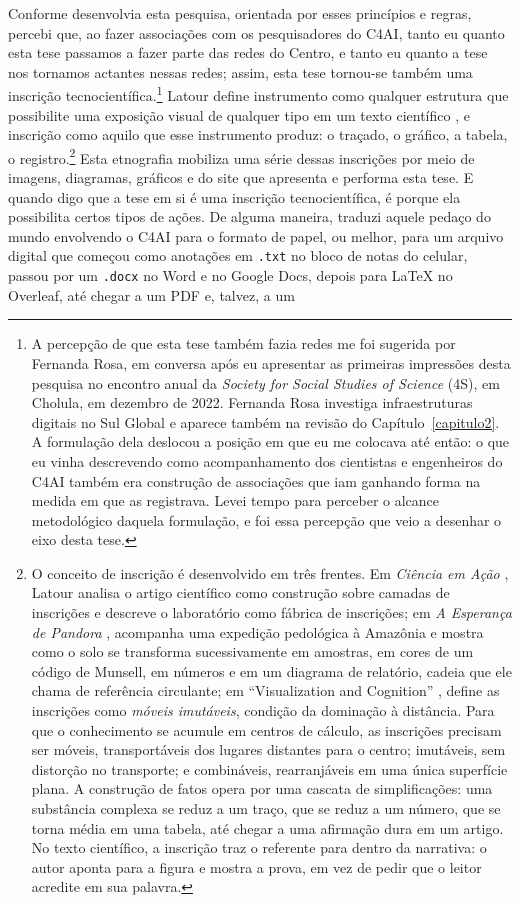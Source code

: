Conforme desenvolvia esta pesquisa, orientada por esses princípios e regras, percebi que, ao fazer associações com os pesquisadores do C4AI, tanto eu quanto esta tese passamos a fazer parte das redes do Centro, e tanto eu quanto a tese nos tornamos actantes nessas redes; assim, esta tese tornou-se também uma inscrição tecnocientífica.\footnote{A percepção de que esta tese também fazia redes me foi sugerida por Fernanda Rosa, em conversa após eu apresentar as primeiras impressões desta pesquisa no encontro anual da \textit{Society for Social Studies of Science} (4S), em Cholula, em dezembro de 2022. Fernanda Rosa investiga infraestruturas digitais no Sul Global e aparece também na revisão do Capítulo~\ref{capitulo2}. A formulação dela deslocou a posição em que eu me colocava até então: o que eu vinha descrevendo como acompanhamento dos cientistas e engenheiros do C4AI também era construção de associações que iam ganhando forma na medida em que as registrava. Levei tempo para perceber o alcance metodológico daquela formulação, e foi essa percepção que veio a desenhar o eixo desta tese.} Latour define instrumento como qualquer estrutura que possibilite uma exposição visual de qualquer tipo em um texto científico \parencite[p.~102]{Latour2011CienciaEmAcao}, e inscrição como aquilo que esse instrumento produz: o traçado, o gráfico, a tabela, o registro.\footnote{O conceito de inscrição é desenvolvido em três frentes. Em \textit{Ciência em Ação} \parencite[caps.~1--2]{Latour2011CienciaEmAcao}, Latour analisa o artigo científico como construção sobre camadas de inscrições e descreve o laboratório como fábrica de inscrições; em \textit{A Esperança de Pandora} \parencite[cap.~2]{Latour2017Esperanca}, acompanha uma expedição pedológica à Amazônia e mostra como o solo se transforma sucessivamente em amostras, em cores de um código de Munsell, em números e em um diagrama de relatório, cadeia que ele chama de referência circulante; em \enquote{Visualization and Cognition} \parencite{Latour1986Visualization}, define as inscrições como \textit{móveis imutáveis}, condição da dominação à distância. Para que o conhecimento se acumule em centros de cálculo, as inscrições precisam ser móveis, transportáveis dos lugares distantes para o centro; imutáveis, sem distorção no transporte; e combináveis, rearranjáveis em uma única superfície plana. A construção de fatos opera por uma cascata de simplificações: uma substância complexa se reduz a um traço, que se reduz a um número, que se torna média em uma tabela, até chegar a uma afirmação dura em um artigo. No texto científico, a inscrição traz o referente para dentro da narrativa: o autor aponta para a figura e mostra a prova, em vez de pedir que o leitor acredite em sua palavra.} Esta etnografia mobiliza uma série dessas inscrições por meio de imagens, diagramas, gráficos e do site que apresenta e performa esta tese. E quando digo que a tese em si é uma inscrição tecnocientífica, é porque ela possibilita certos tipos de ações. De alguma maneira, traduzi aquele pedaço do mundo envolvendo o C4AI para o formato de papel, ou melhor, para um arquivo digital que começou como anotações em \texttt{.txt} no bloco de notas do celular, passou por um \texttt{.docx} no Word e no Google Docs, depois para LaTeX no Overleaf, até chegar a um PDF e, talvez, a um 